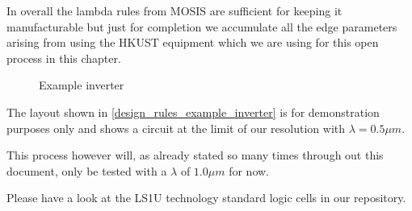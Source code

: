 In overall the lambda rules from MOSIS are sufficient for keeping it manufacturable but just for completion we accumulate all the edge parameters arising from using the HKUST equipment which we are using for this open process in this chapter.

\begin{figure}[H]
	\centering
	\begin{tikzpicture}[node distance =1cm, auto, thick,scale=0.4, every node/.style={transform shape}]
		
	\end{tikzpicture}
	\caption{Example inverter}
	\label{design_rules_example_inverter}
\end{figure}

The layout shown in \autoref{design_rules_example_inverter} is for demonstration purposes only and shows a circuit at the limit of our resolution with $\lambda = 0.5 \mu m$.

This process however will, as already stated so many times through out this document, only be tested with a $\lambda$ of $1.0 \mu m$ for now.

Please have a look at the LS1U technology standard logic cells in our repository.